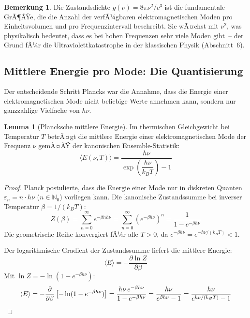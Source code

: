 ﻿\documentclass[a4paper,12pt]{article}
\theoremstyle{definition}
\newtheorem{lemma}{Lemma}
\newtheorem{bemerkung}{Bemerkung}
\begin{document}
\begin{bemerkung}
    Die Zustandsdichte $g(\nu) = 8\pi\nu^2/c^3$ ist die fundamentale GrÃ¶ÃŸe,
    die die Anzahl der verfÃ¼gbaren elektromagnetischen Moden pro Einheitsvolumen
    und pro Frequenzintervall beschreibt. Sie wÃ¤chst mit $\nu^2$, was physikalisch
    bedeutet, dass es bei hohen Frequenzen sehr viele Moden gibt~-- der Grund
    fÃ¼r die Ultraviolettkatastrophe in der klassischen Physik (Abschnitt~6).
\end{bemerkung}

\subsection{Mittlere Energie pro Mode: Die Quantisierung}

Der entscheidende Schritt Plancks war die Annahme, dass die Energie einer
elektromagnetischen Mode nicht beliebige Werte annehmen kann, sondern nur
ganzzahlige Vielfache von $h\nu$.

\begin{lemma}[Plancksche mittlere Energie]
\label{lem:energie}
    Im thermischen Gleichgewicht bei Temperatur $T$ betrÃ¤gt die mittlere
    Energie einer elektromagnetischen Mode der Frequenz $\nu$ gemÃ¤ÃŸ der
    kanonischen Ensemble-Statistik:
    \[
        \langle E(\nu, T) \rangle
        = \frac{h\nu}{\exp\!\left(\dfrac{h\nu}{k_B T}\right) - 1}
    \]
\end{lemma}

\begin{proof}
    Planck postulierte, dass die Energie einer Mode nur in diskreten
    Quanten $\varepsilon_n = n \cdot h\nu$ ($n \in \mathbb{N}_0$) vorliegen kann.
    Die kanonische Zustandssumme bei inverser Temperatur $\beta = 1/(k_B T)$:
    \[
        Z(\beta) = \sum_{n=0}^\infty e^{-\beta n h\nu}
        = \sum_{n=0}^\infty \left(e^{-\beta h\nu}\right)^n
        = \frac{1}{1 - e^{-\beta h\nu}}
    \]
    Die geometrische Reihe konvergiert fÃ¼r alle $T > 0$, da
    $e^{-\beta h\nu} = e^{-h\nu/(k_BT)} < 1$.

    Der logarithmische Gradient der Zustandssumme liefert die mittlere Energie:
    \[
        \langle E \rangle = -\frac{\partial \ln Z}{\partial \beta}
    \]
    Mit $\ln Z = -\ln\!\left(1 - e^{-\beta h\nu}\right)$:
    \[
        \langle E \rangle
        = -\frac{\partial}{\partial\beta}\left[-\ln(1 - e^{-\beta h\nu})\right]
        = \frac{h\nu \, e^{-\beta h\nu}}{1 - e^{-\beta h\nu}}
        = \frac{h\nu}{e^{\beta h\nu} - 1}
        = \frac{h\nu}{e^{h\nu/(k_B T)} - 1} \qedhere
    \]
\end{proof}
\end{document}
